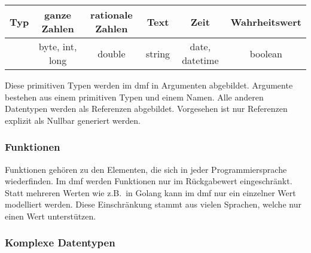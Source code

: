 \documentclass[./einleitung.tex]{subfiles}
\begin{document}
    \begin{center}
        \begin{tabular}{| c || c | c | c | c | c |}
            \hline
            Typ & ganze Zahlen & rationale Zahlen & Text & Zeit & Wahrheitswert \\
            \hline
            & byte, int, long & double & string & date, datetime & boolean \\
            \hline
        \end{tabular}
    \end{center}

    Diese primitiven Typen werden im \acrshort{dmf} in Argumenten abgebildet.
    Argumente bestehen aus einem primitiven Typen und einem Namen.
    Alle anderen Datentypen werden als Referenzen abgebildet.
    Vorgesehen ist nur Referenzen explizit als Nullbar generiert werden.

    \subsubsection{Funktionen}
    Funktionen gehören zu den Elementen, die sich in jeder Programmiersprache wiederfinden.
    Im \acrshort{dmf} werden Funktionen nur im Rückgabewert eingeschränkt.
    Statt mehreren Werten wie z.B.\ in Golang kann im \acrshort{dmf} nur ein einzelner Wert modelliert werden.
    Diese Einschränkung stammt aus vielen Sprachen, welche nur einen Wert unterstützen.

    \subsubsection{Komplexe Datentypen}
\end{document}
